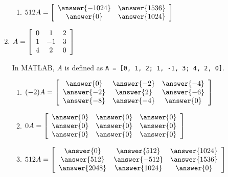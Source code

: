 \documentclass{ximera}
\begin{document}
\begin{exercise}
\begin{enumerate}
\begin{enumerate}
      \item $512A =
      \startmat{cc}
      \answer{-1024} & \answer{1536} \\
      \answer{0} & \answer{1024}
      \stopmat$
    \end{enumerate}

  \item
    $A = \startmat{ccc}
      0 & 1 & 2 \\
      1 & -1 & 3 \\
      4 & 2 & 0
    \stopmat$

    \begin{hint}
        
          In MATLAB, $A$ is defined as \texttt{A = [0, 1, 2; 1, -1, 3; 4, 2, 0]}.
    \end{hint}

    \begin{enumerate}
      \item $(-2)A = 
      \startmat{ccc}
      \answer{0} & \answer{-2} & \answer{-4} \\
      \answer{-2} & \answer{2} & \answer{-6} \\
      \answer{-8} & \answer{-4} & \answer{0}
      \stopmat$

      \item $0A =
      \startmat{ccc}
      \answer{0} & \answer{0} & \answer{0} \\
      \answer{0} & \answer{0} & \answer{0} \\
      \answer{0} & \answer{0} & \answer{0}
      \stopmat$

      \item $512A =
      \startmat{ccc}
      \answer{0} & \answer{512} & \answer{1024} \\
      \answer{512} & \answer{-512} & \answer{1536} \\
      \answer{2048} & \answer{1024} & \answer{0}
      \stopmat$
    \end{enumerate}


  
  \end{enumerate}

\end{exercise}
\end{document}
